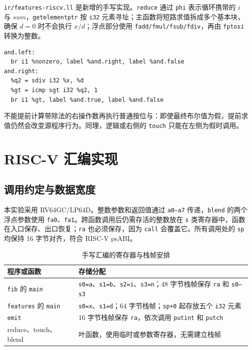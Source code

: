 \documentclass[UTF8,a4paper,10pt]{ctexart}
\begin{document}
\texttt{ir/features-riscv.ll} 是新增的手写实现。\texttt{reduce} 通过 \texttt{phi} 表示循环携带的 $i$ 与 $sum$，\texttt{getelementptr} 按 \texttt{i32} 元素寻址；主函数将短路求值拆成多个基本块，确保 $d=0$ 时不会执行 $x/d$；浮点部分使用 \texttt{fadd/fmul/fsub/fdiv}，再由 \texttt{fptosi} 转换为整数。

\begin{lstlisting}[caption={逻辑与的短路控制流}]
and.left:
  br i1 %nonzero, label %and.right, label %and.false
and.right:
  %q2 = sdiv i32 %x, %d
  %gt = icmp sgt i32 %q2, 1
  br i1 %gt, label %and.true, label %and.false
\end{lstlisting}

不能提前计算带除法的右操作数再执行普通按位与：即使最终布尔值为假，提前求值仍然会改变源程序行为。同理，逻辑或右侧的 \texttt{touch} 只能在左侧为假时调用。

\section{RISC-V 汇编实现}

\subsection{调用约定与数据宽度}

本实验采用 RV64GC/LP64D。整数参数和返回值通过 \texttt{a0--a7} 传递，\texttt{blend} 的两个浮点参数使用 \texttt{fa0}、\texttt{fa1}。跨函数调用后仍需存活的整数放在 \texttt{s} 类寄存器中，函数在入口保存、出口恢复；\texttt{ra} 也必须保存，因为 \texttt{call} 会覆盖它。所有调用处的 \texttt{sp} 均保持 16 字节对齐，符合 RISC-V psABI\cite{riscv-abi}。

\begin{table}[H]
  \centering
  \caption{手写汇编的寄存器与栈帧安排}
  \begin{tabularx}{\textwidth}{p{3.7cm}Y}
    \toprule
    程序或函数 & 存储分配 \\
    \midrule
    \texttt{fib} 的 \texttt{main} & \texttt{s0=a}、\texttt{s1=b}、\texttt{s2=i}、\texttt{s3=n}；48 字节栈帧保存 \texttt{ra} 和 \texttt{s0--s3} \\
    \texttt{features} 的 \texttt{main} & \texttt{s0=x}、\texttt{s1=d}；64 字节栈帧；\texttt{sp+0} 起存放五个 \texttt{i32} 元素 \\
    \texttt{emit} & 16 字节栈帧保存 \texttt{ra}，依次调用 \texttt{putint} 和 \texttt{putch} \\
    reduce、touch、blend & 叶函数，使用临时或参数寄存器，无需建立栈帧 \\
    \bottomrule
  \end{tabularx}
\end{table}
\end{document}
